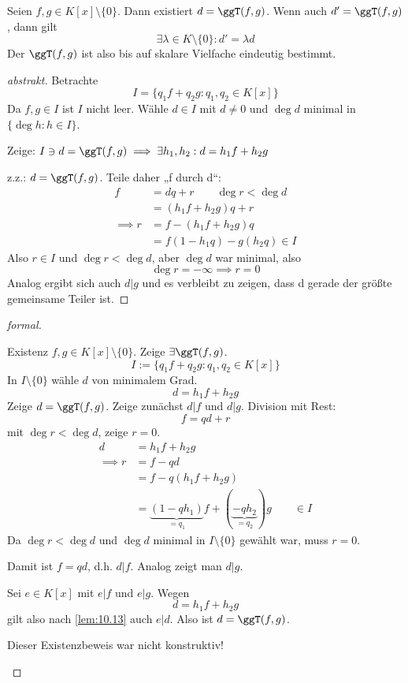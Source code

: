 \documentclass{mycourse}
\begin{document}
\begin{prop}
\label{prop:12.3}
Seien $f,g\in K[x]\setminus\{0\}$.
Dann existiert $d=\ggT(f,g)$.
Wenn auch $d'=\ggT(f,g)$, dann gilt
\[
\exists \lambda \in K\setminus\{0\}:d'=\lambda d
\]
Der $\ggT(f,g)$ ist also bis auf skalare Vielfache eindeutig bestimmt.

\begin{proof}[abstrakt]
Betrachte
\[
I=\{q_1f+q_2g:q_1,q_2\in K[x]\}
\]
Da $f,g\in I$ ist $I$ nicht leer.
Wähle $d\in I$ mit $d\neq 0$ und $\deg d$ minimal in $\{\deg h:h\in I\}$.

Zeige: $I\ni d=\ggT(f,g) \implies \exists h_1,h_2 : d=h_1f+h_2g$

z.z.: $d=\ggT(f,g)$.
Teile daher „f durch d“:
\begin{align*}
f&=dq + r \qquad \deg r < \deg d\\
&=(h_1f + h_2g)q + r\\
\implies r&= f-(h_1f+h_2g)q\\
&= f(1-h_1q) - g(h_2q) \in I
\end{align*}
Also $r\in I$ und $\deg r < \deg d$, aber $\deg d$ war minimal, also
\[
\deg r = -\infty \implies r=0
\]
Analog ergibt sich auch $d|g$ und es verbleibt zu zeigen, dass d gerade der größte gemeinsame Teiler ist.

\end{proof}

\begin{proof}[formal]
	\begin{seg}{Existenz}
$f,g\in K[x] \setminus \{0\}$. Zeige $\exists \ggT(f,g)$.
\[
I := \{q_1f+q_2g:q_1,q_2\in K[x]\}
\]
In $I\setminus \{0\}$ wähle $d$ von minimalem Grad.
\[
d=h_1f +h_2g
\]
Zeige $d=\ggT(f,g)$.
Zeige zunächst $d|f$ und $d|g$.
Division mit Rest:
\[
f=qd+r
\]
mit $\deg r < \deg d$, zeige $r=0$.
\begin{align*}
d&=h_1f+h_2g \\
\implies r&=f-qd \\
			 &= f-q(h_1f+h_2g)\\
	   &= \underbrace{(1-qh_1)}_{=q_1}f + (\underbrace{-qh_2}_{=q_2}) g \qquad \in I
\end{align*}
Da $\deg r < \deg d$ und $\deg d$ minimal in $I\setminus \{0\}$ gewählt war, muss $r=0$.

Damit ist $f=qd$, d.h. $d|f$.
Analog zeigt man $d|g$.

Sei $e\in K[x]$ mit $e|f$ und $e|g$.
Wegen
\[
d=h_1f+h_2g
\]
gilt also nach \ref{lem:10.13} auch $e|d$.
Also ist $d=\ggT(f,g)$.
\end{seg}
\begin{note}
Dieser Existenzbeweis war nicht konstruktiv!
\end{note}


\end{proof}
\end{prop}
\end{document}
